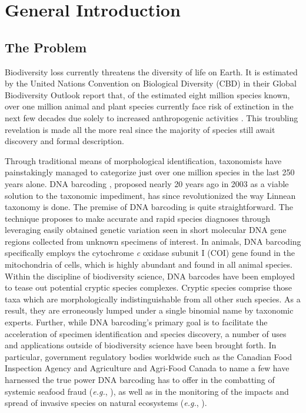 \linespread{1.0}

\chapter{General Introduction}

\section{The Problem}

Biodiversity loss currently threatens the diversity of life on Earth. It is estimated by the United Nations Convention on Biological Diversity (CBD) in their Global Biodiversity Outlook report that, of the estimated eight million species known, over one million animal and plant species currently face risk of extinction in the next few decades due solely to increased anthropogenic activities \cite{cbd2020global}. This troubling revelation is made all the more real since the majority of species still await discovery and formal description. 

\vspace{5mm}

Through traditional means of morphological identification, taxonomists have \\ painstakingly managed to categorize just over one million species in the last 250 years alone. DNA barcoding \cite{hebert2003biological, hebert2003barcoding}, proposed nearly 20 years ago in 2003 as a viable solution to the taxonomic impediment, has since revolutionized the way Linnean taxonomy is done. The premise of DNA barcoding is quite straightforward. The technique proposes to make accurate and rapid species diagnoses through leveraging easily obtained genetic variation seen in short molecular DNA gene regions collected from unknown specimens of interest. In animals, DNA barcoding specifically employs the cytochrome \textit{c} oxidase subunit I (COI) gene found in the mitochondria of cells, which is highly abundant and found in all animal species. Within the discipline of biodiversity science, DNA barcodes have been employed to tease out potential cryptic species complexes. Cryptic species comprise those taxa which are morphologically indistinguishable from all other such species. As a result, they are erroneously lumped under a single binomial name by taxonomic experts. Further, while DNA barcoding's primary goal is to facilitate the acceleration of specimen identification and species discovery, a number of uses and applications outside of biodiversity science have been brought forth. In particular, government regulatory bodies worldwide such as the Canadian Food Inspection Agency and Agriculture and Agri-Food Canada to name a few have harnessed the true power DNA barcoding has to offer in the combatting of systemic seafood fraud (\textit{e.g.}, \cite{shehata2018dna, shehata2019survey}), as well as in the monitoring of the impacts and spread of invasive species on natural ecosystems (\textit{e.g.}, \cite{madden2019using}).

